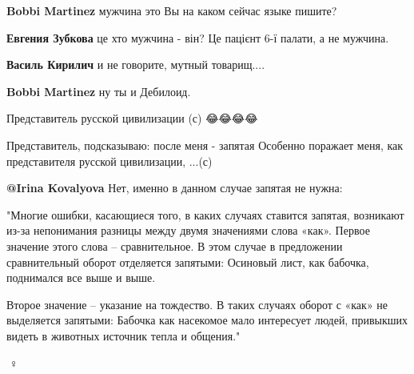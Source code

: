 \begin{itemize}
\begin{itemize}
\textbf{Bobbi Martinez} мужчина это Вы на каком сейчас языке пишите?


\textbf{Евгения Зубкова} це хто мужчина - він? Це пацієнт 6-ї палати, а не мужчина.


\textbf{Василь Кирилич} и не говорите, мутный товарищ....


\textbf{Bobbi Martinez} ну ты и Дебилоид.
\end{itemize}


Представитель русской цивилизации (с)
😂😂😂😂


Представитель, подсказываю: после меня - запятая \Laughey[1.0][white]
Особенно поражает меня, как представителя русской цивилизации, ...(с)

\begin{itemize}

\textbf{@Irina Kovalyova} Нет, именно в данном случае запятая не нужна:

"Многие ошибки, касающиеся того, в каких случаях ставится запятая, возникают
из-за непонимания разницы между двумя значениями слова «как». Первое значение
этого слова – сравнительное. В этом случае в предложении сравнительный оборот
отделяется запятыми: Осиновый лист, как бабочка, поднимался все выше и выше.

Второе значение – указание на тождество. В таких случаях оборот с «как» не
выделяется запятыми: Бабочка как насекомое мало интересует людей, привыкших
видеть в животных источник тепла и общения."
\end{itemize}


🤦♀️


\end{itemize}
